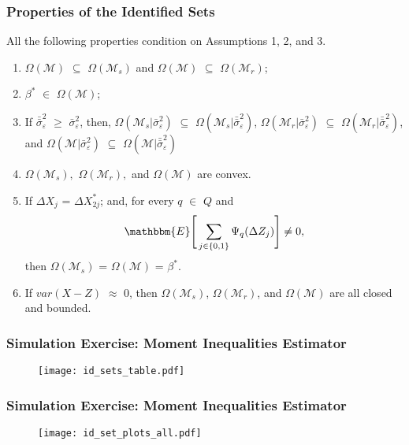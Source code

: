 \documentclass[notes=show]{beamer}
\begin{document}
\begin{frame}
\frametitle{Properties of the Identified Sets}

All the following properties condition on Assumptions 1, 2, and 3.
\begin{enumerate}
	\item $\Omega(\mathcal{M})$ $\subseteq$ $\Omega(\mathcal{M}_{s})$ and $\Omega(\mathcal{M})$ $\subseteq$ $\Omega(\mathcal{M}_{r})$;
	\item $\beta^{*}$ $\in$ $\Omega(\mathcal{M})$;
	\item If $\bar{\bar{\sigma}}^{2}_{\varepsilon}$ $\geq$ $\bar{\sigma}^{2}_{\varepsilon}$, then, $\Omega(\mathcal{M}_{s}|\bar{\sigma}^{2}_{\varepsilon})$ $\subseteq$ $\Omega(\mathcal{M}_{s}|\bar{\bar{\sigma}}^{2}_{\varepsilon})$, $\Omega(\mathcal{M}_{r}|\bar{\sigma}^{2}_{\varepsilon})$ $\subseteq$ $\Omega(\mathcal{M}_{r}|\bar{\bar{\sigma}}^{2}_{\varepsilon})$, and $\Omega(\mathcal{M}|\bar{\sigma}^{2}_{\varepsilon})$ $\subseteq$ $\Omega(\mathcal{M}|\bar{\bar{\sigma}}^{2}_{\varepsilon})$
	\item $\Omega(\mathcal{M}_{s}),$ $\Omega(\mathcal{M}_{r}),$ and $\Omega(\mathcal{M})$ are convex.
	\item If $\Delta X_{j}$ = $\Delta X^{*}_{2j}$; and, for every $q$ $\in$ $Q$ and
	\begin{align*}
	\mathbbm{E}\Bigg[\sum_{j\in\{0,1\}}\Psi_{q}(\Delta Z_{j})\Bigg] \neq 0,
	\end{align*}
	then $\Omega(\mathcal{M}_{s})$ = $\Omega(\mathcal{M})$ = $\beta^{*}$.
	\item If $var(X-Z)$ $\approx$ $0$, then $\Omega(\mathcal{M}_{s})$, $\Omega(\mathcal{M}_{r})$, and $\Omega(\mathcal{M})$ are all closed and bounded.
\end{enumerate}
\end{frame}
\begin{frame}
\frametitle{Simulation Exercise: Moment Inequalities Estimator}

\begin{figure}[h!]
\centering \texttt{[image: id\_sets\_table.pdf]}
\end{figure}

\end{frame}
\begin{frame}
\frametitle{Simulation Exercise: Moment Inequalities Estimator}

\begin{figure}[h!]
\centering \texttt{[image: id\_set\_plots\_all.pdf]}
\end{figure}

\end{frame}
\end{document}
